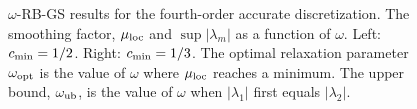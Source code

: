\documentclass{article}
\begin{document}
{
\renewcommand{\figWidth}{7.cm}
\newcommand{\trimfig}[2]{\trimhb{#1}{#2}{.0}{.0}{.0}{.0}}
\begin{figure}[hbt]
\begin{center}
\end{center}
\caption{$\omega$-RB-GS results for the fourth-order accurate discretization.
The smoothing factor, $\mu_{\rm loc}$ and $\sup \vert \lambda_m \vert$ as a function of $\omega$.
Left: $c_{\rm min}=1/2$. Right: $c_{\rm min}=1/3$. The optimal relaxation parameter $\omega_{\rm opt}$
is the value of $\omega$ where $\mu_{\rm loc}$ reaches a minimum. The upper bound, $\omega_{\rm ub}$,
is the value of $\omega$ when $\vert\lambda_1\vert$ first equals $\vert\lambda_2\vert$. }
\label{fig:redBlackMu4}
\end{figure}
}






\clearpage %
\end{document}

